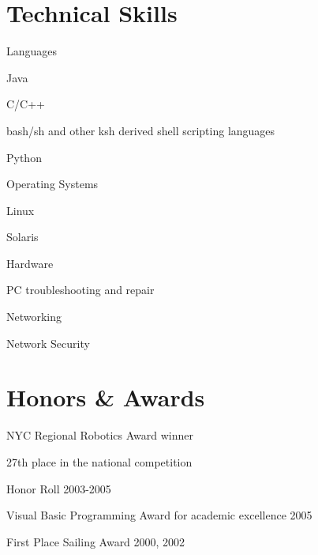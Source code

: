 \documentclass[a4paper,margin,line]{resume}
\begin{document}
\begin{resume}
\section{\mysidestyle Technical Skills}
	\begin{compactdesc}
		\item[Languages] \ 
		\small
		\begin{compactitem}
			\item Java
			\item C/C++
			\item bash/sh and other ksh derived shell scripting languages
			\item Python
		\end{compactitem}
		\normalsize
		\item[Operating Systems] \ 
		\small
		\begin{compactitem}
			\item Linux
			\item Solaris
		\end{compactitem}
		\normalsize
		\item[Hardware] \ 
		\small
		\begin{compactitem}
			\item PC troubleshooting and repair
			\item Networking
			\item Network Security
		\end{compactitem}
		\normalsize
	\end{compactdesc}

\section{\mysidestyle Honors \& Awards}
	\begin{asparablank}
		\item NYC Regional Robotics Award winner
		\begin{compactitem}
			\item {\small 27th place in the national competition}
		\end{compactitem}
		\item Honor Roll 2003-2005
		\item Visual Basic Programming Award for academic excellence 2005
		\item First Place Sailing Award 2000, 2002
	\end{asparablank}


\end{resume}
\end{document}
